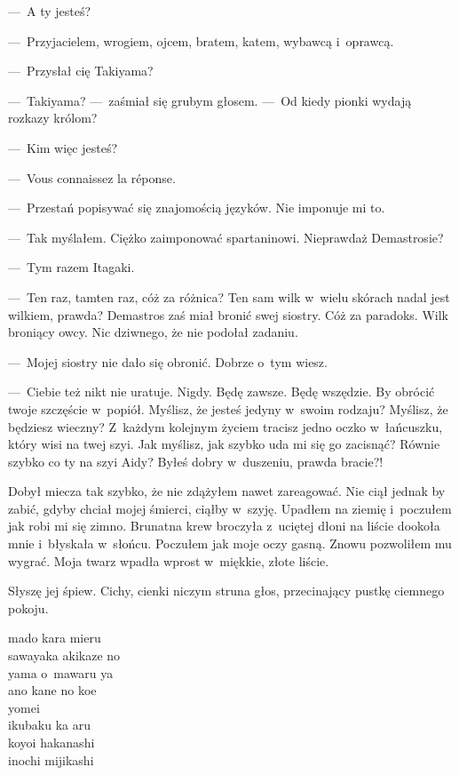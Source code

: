 ---~A ty jesteś?

---~Przyjacielem, wrogiem, ojcem, bratem, katem, wybawcą i~oprawcą.

---~Przysłał cię Takiyama?

---~Takiyama? ---~zaśmiał się grubym głosem. ---~Od kiedy pionki wydają rozkazy królom?

---~Kim więc jesteś?

---~Vous connaissez la réponse.

---~Przestań popisywać się znajomością języków. Nie imponuje mi to.

---~Tak myślałem. Ciężko zaimponować spartaninowi. Nieprawdaż Demastrosie?

---~Tym razem Itagaki.

---~Ten raz, tamten raz, cóż za różnica? Ten sam wilk w~wielu skórach nadal jest wilkiem, prawda? Demastros zaś miał bronić swej siostry. Cóż za paradoks. Wilk broniący owcy. Nic dziwnego, że nie podołał zadaniu.

---~Mojej siostry nie dało się obronić. Dobrze o~tym wiesz.

---~Ciebie też nikt nie uratuje. Nigdy. Będę zawsze. Będę wszędzie. By obrócić twoje szczęście w~popiół. Myślisz, że jesteś jedyny w~swoim rodzaju? Myślisz, że będziesz wieczny? Z~każdym kolejnym życiem tracisz jedno oczko w~łańcuszku, który wisi na twej szyi. Jak myślisz, jak szybko uda mi się go zacisnąć? Równie szybko co ty na szyi Aidy? Byłeś dobry w~duszeniu, prawda bracie?!

Dobył miecza tak szybko, że nie zdążyłem nawet zareagować. Nie ciął jednak by zabić, gdyby chciał mojej śmierci, ciąłby w~szyję. Upadłem na ziemię i~poczułem jak robi mi się zimno. Brunatna krew broczyła z~uciętej dłoni na liście dookoła mnie i~błyskała w~słońcu. Poczułem jak moje oczy gasną. Znowu pozwoliłem mu wygrać. Moja twarz wpadła wprost w~miękkie, złote liście.

\paraSep

Słyszę jej śpiew. Cichy, cienki niczym struna głos, przecinający pustkę ciemnego pokoju.

\begin{itquote}
mado kara mieru\\
sawayaka akikaze no\\
yama o~mawaru ya\\
ano kane no koe\\
yomei\\
ikubaku ka aru\\
koyoi hakanashi\\
inochi mijikashi\\
\end{itquote}

